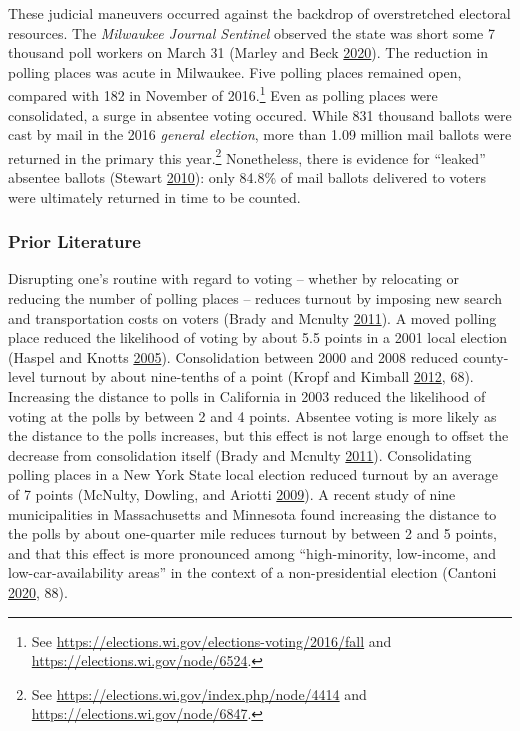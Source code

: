 \documentclass[
  12pt,
]{article}
\begin{document}
These judicial maneuvers occurred against the backdrop of overstretched electoral resources. The \emph{Milwaukee Journal Sentinel} observed the state was short some 7 thousand poll workers on March 31 (Marley and Beck \protect\hyperlink{ref-Marley2020}{2020}). The reduction in polling places was acute in Milwaukee. Five polling places remained open, compared with 182 in November of 2016.\footnote{See \url{https://elections.wi.gov/elections-voting/2016/fall} and \url{https://elections.wi.gov/node/6524}.} Even as polling places were consolidated, a surge in absentee voting occured. While 831 thousand ballots were cast by mail in the 2016 \emph{general election}, more than 1.09 million mail ballots were returned in the primary this year.\footnote{See \url{https://elections.wi.gov/index.php/node/4414} and \url{https://elections.wi.gov/node/6847}.} Nonetheless, there is evidence for ``leaked'' absentee ballots (Stewart \protect\hyperlink{ref-Stewart2010}{2010}): only 84.8\% of mail ballots delivered to voters were ultimately returned in time to be counted.

\hypertarget{prior-literature}{%
\subsubsection*{Prior Literature}\label{prior-literature}}

Disrupting one's routine with regard to voting -- whether by relocating or reducing the number of polling places -- reduces turnout by imposing new search and transportation costs on voters (Brady and Mcnulty \protect\hyperlink{ref-Brady2011}{2011}). A moved polling place reduced the likelihood of voting by about 5.5 points in a 2001 local election (Haspel and Knotts \protect\hyperlink{ref-Haspel2005}{2005}). Consolidation between 2000 and 2008 reduced county-level turnout by about nine-tenths of a point (Kropf and Kimball \protect\hyperlink{ref-Kropf2012}{2012}, 68). Increasing the distance to polls in California in 2003 reduced the likelihood of voting at the polls by between 2 and 4 points. Absentee voting is more likely as the distance to the polls increases, but this effect is not large enough to offset the decrease from consolidation itself (Brady and Mcnulty \protect\hyperlink{ref-Brady2011}{2011}). Consolidating polling places in a New York State local election reduced turnout by an average of 7 points (McNulty, Dowling, and Ariotti \protect\hyperlink{ref-McNulty2009}{2009}). A recent study of nine municipalities in Massachusetts and Minnesota found increasing the distance to the polls by about one-quarter mile reduces turnout by between 2 and 5 points, and that this effect is more pronounced among ``high-minority, ­low-income, and low-car-availability areas'' in the context of a non-presidential election (Cantoni \protect\hyperlink{ref-Cantoni2020}{2020}, 88).
\end{document}
